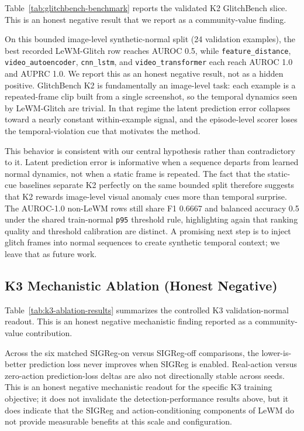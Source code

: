 Table~\ref{tab:glitchbench-benchmark} reports the validated K2 GlitchBench slice. This is an
honest negative result that we report as a community-value finding.



On this bounded image-level synthetic-normal split (24 validation examples), the best recorded
LeWM-Glitch row reaches AUROC 0.5, while \texttt{feature\_distance},
\texttt{video\_autoencoder}, \texttt{cnn\_lstm}, and \texttt{video\_transformer} each reach
AUROC 1.0 and AUPRC 1.0. We report this as an honest negative result, not as a hidden positive.
GlitchBench K2 is fundamentally an image-level task: each example is a repeated-frame clip built
from a single screenshot, so the temporal dynamics seen by LeWM-Glitch are trivial. In that
regime the latent prediction error collapses toward a nearly constant within-example signal, and
the episode-level scorer loses the temporal-violation cue that motivates the method.

This behavior is consistent with our central hypothesis rather than contradictory to it. Latent
prediction error is informative when a sequence departs from learned normal dynamics, not when a
static frame is repeated. The fact that the static-cue baselines separate K2 perfectly on the
same bounded split therefore suggests that K2 rewards image-level visual anomaly cues more than
temporal surprise. The AUROC-1.0 non-LeWM rows still share F1 0.6667 and balanced accuracy 0.5
under the shared train-normal \texttt{p95} threshold rule, highlighting again that ranking
quality and threshold calibration are distinct. A promising next step is to inject glitch frames
into normal sequences to create synthetic temporal context; we leave that as future work.

\subsection{K3 Mechanistic Ablation (Honest Negative)}

Table~\ref{tab:k3-ablation-results} summarizes the controlled K3 validation-normal readout.
This is an honest negative mechanistic finding reported as a community-value contribution.



Across the six matched SIGReg-on versus SIGReg-off comparisons, the lower-is-better prediction
loss never improves when SIGReg is enabled. Real-action versus zero-action prediction-loss
deltas are also not directionally stable across seeds. This is an honest negative mechanistic
readout for the specific K3 training objective; it does not invalidate the detection-performance
results above, but it does indicate that the SIGReg and action-conditioning components of
LeWM do not provide measurable benefits at this scale and configuration.

